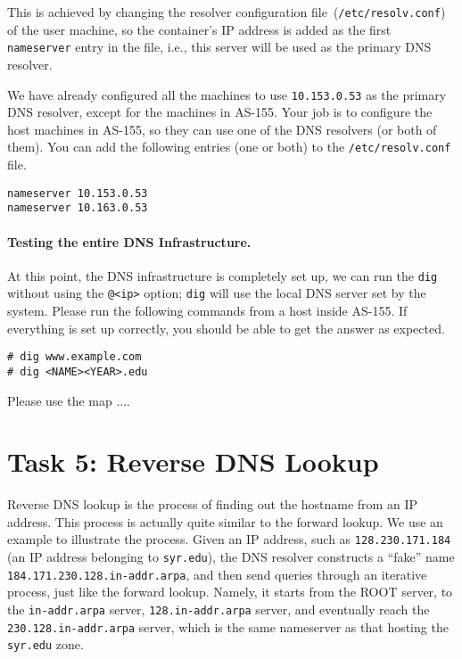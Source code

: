 This is achieved by changing
the resolver configuration file~(\texttt{/etc/resolv.conf}) of the user machine,
so the container's IP address is added as the first \texttt{nameserver} entry in the file, i.e.,
this server will be used as the primary DNS resolver.

We have already configured all the machines to use \texttt{10.153.0.53} 
as the primary DNS resolver, except for the machines in AS-155. Your job is to
configure the host machines in AS-155, so they can use one 
of the DNS resolvers (or both of them).
You can add the following entries (one or both) to the 
\texttt{/etc/resolv.conf} file.

\begin{lstlisting}
nameserver 10.153.0.53
nameserver 10.163.0.53
\end{lstlisting}


\paragraph{Testing the entire DNS Infrastructure.} 
At this point, the DNS infrastructure is completely set up,
we can run the \texttt{dig} without using the \texttt{@<ip>} option; 
\texttt{dig} will use the local DNS server set by the system. Please 
run the following commands from a host inside AS-155. If everything 
is set up correctly, you should be able to get the answer as expected. 


\begin{lstlisting}
# dig www.example.com
# dig <NAME><YEAR>.edu 
\end{lstlisting}


Please use the map ....




\section{Task 5: Reverse DNS Lookup} 

Reverse DNS lookup is the process of finding out the hostname 
from an IP address. 
This process is actually quite similar to the forward lookup. 
We use an example to illustrate the process. Given an IP address,
such as \texttt{128.230.171.184} (an IP address belonging to
\texttt{syr.edu}), the DNS resolver constructs a ``fake''
name \texttt{184.171.230.128.in-addr.arpa}, and then send queries through an
iterative process, just like the forward lookup. Namely, it starts from the
ROOT server, to the \texttt{in-addr.arpa} server, \texttt{128.in-addr.arpa} server,
and eventually reach the \texttt{230.128.in-addr.arpa} server, which is the
same nameserver as that hosting the \texttt{syr.edu} zone. 


